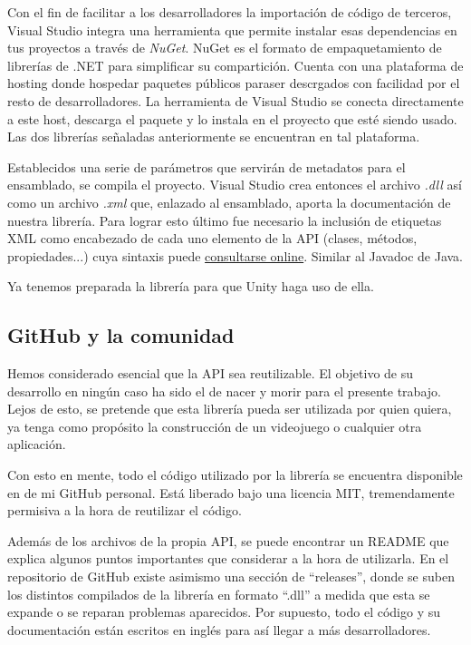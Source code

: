 Con el fin de facilitar a los desarrolladores la importación de código de terceros, Visual Studio integra una herramienta que permite instalar esas dependencias en tus proyectos a través de \textit{NuGet}. NuGet es el formato de empaquetamiento de librerías de .NET para simplificar su compartición. Cuenta con una plataforma de hosting donde hospedar paquetes públicos paraser descrgados con facilidad por el resto de desarrolladores. La herramienta de Visual Studio se conecta directamente a este host, descarga el paquete y lo instala en el proyecto que esté siendo usado. Las dos librerías señaladas anteriormente se encuentran en tal plataforma.

Establecidos una serie de parámetros que servirán de metadatos para el ensamblado, se compila el proyecto. Visual Studio crea entonces el archivo \textit{.dll} así como un archivo \textit{.xml} que, enlazado al ensamblado, aporta la documentación de nuestra librería. Para lograr esto último fue necesario la inclusión de etiquetas XML como encabezado de cada uno elemento de la API (clases, métodos, propiedades...) cuya sintaxis puede \href{https://docs.microsoft.com/en-us/dotnet/csharp/programming-guide/xmldoc/xml-documentation-comments}{consultarse online}. Similar al Javadoc de Java.

Ya tenemos preparada la librería para que Unity haga uso de ella.

\subsection{GitHub y la comunidad}
Hemos considerado esencial que la API sea reutilizable. El objetivo de su desarrollo en ningún caso ha sido el de nacer y morir para el presente trabajo. Lejos de esto, se pretende que esta librería pueda ser utilizada por quien quiera, ya tenga como propósito la construcción de un videojuego o cualquier otra aplicación.

Con esto en mente, todo el código utilizado por la librería se encuentra disponible en  de mi GitHub personal. Está liberado bajo una licencia MIT, tremendamente permisiva a la hora de reutilizar el código.

Además de los archivos de la propia API, se puede encontrar un README que explica algunos puntos importantes que considerar a la hora de utilizarla. En el repositorio de GitHub existe asimismo una sección de ``releases'', donde se suben los distintos compilados de la librería en formato ``.dll'' a medida que esta se expande o se reparan problemas aparecidos. Por supuesto, todo el código y su documentación están escritos en inglés para así llegar a más desarrolladores.


